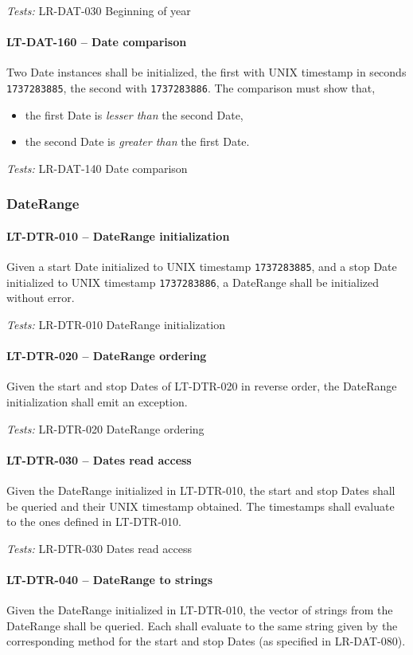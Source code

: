 \textit{Tests: } LR-DAT-030 Beginning of year

\paragraph{LT-DAT-160 -- Date comparison}
Two Date instances shall be initialized, the first with
UNIX timestamp in seconds \lstinline{1737283885}, the second with
\lstinline{1737283886}.
The comparison must show that,
\begin{itemize}
\item the first Date is \emph{lesser than} the second Date,
\item the second Date is \emph{greater than} the first Date.
\end{itemize}

\textit{Tests: } LR-DAT-140 Date comparison

\subsubsection{DateRange}
\paragraph{LT-DTR-010 -- DateRange initialization}
Given a start Date initialized to UNIX timestamp \lstinline{1737283885},
and a stop Date initialized to UNIX timestamp \lstinline{1737283886},
a DateRange shall be initialized without error.

\textit{Tests: } LR-DTR-010 DateRange initialization

\paragraph{LT-DTR-020 -- DateRange ordering}
Given the start and stop Dates of LT-DTR-020 in reverse order,
the DateRange initialization shall emit an exception.

\textit{Tests: } LR-DTR-020 DateRange ordering

\paragraph{LT-DTR-030 -- Dates read access}
Given the DateRange initialized in LT-DTR-010, the start and stop
Dates shall be queried and their UNIX timestamp obtained.
The timestamps shall evaluate to the ones defined in LT-DTR-010.

\textit{Tests: } LR-DTR-030 Dates read access

\paragraph{LT-DTR-040 -- DateRange to strings}
Given the DateRange initialized in LT-DTR-010, the vector of
strings from the DateRange shall be queried. Each shall evaluate
to the same string given by the corresponding method for the start and stop
Dates (as specified in LR-DAT-080).

